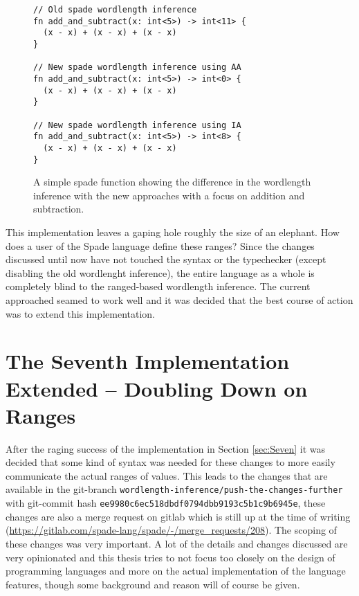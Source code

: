 \begin{figure}
\begin{verbatim}
// Old spade wordlength inference
fn add_and_subtract(x: int<5>) -> int<11> {
  (x - x) + (x - x) + (x - x)
}

// New spade wordlength inference using AA
fn add_and_subtract(x: int<5>) -> int<0> {
  (x - x) + (x - x) + (x - x)
}

// New spade wordlength inference using IA
fn add_and_subtract(x: int<5>) -> int<8> {
  (x - x) + (x - x) + (x - x)
}
\end{verbatim}
  \caption{A simple spade function showing the difference in the wordlength inference with the new approaches with a focus on addition and subtraction.}
  \label{fig:CodeThatWorksNow}
\end{figure}

This implementation leaves a gaping hole roughly the size of an elephant. How does a user of the Spade language define these ranges? Since the changes discussed until now have not touched the syntax or the typechecker (except disabling the old wordlenght inference), the entire language as a whole is completely blind to the ranged-based wordlength inference. The current approached seamed to work well and it was decided that the best course of action was to extend this implementation.

\section{The Seventh Implementation Extended -- Doubling Down on Ranges}
\label{sec:Seven2}
After the raging success of the implementation in Section \ref{sec:Seven} it was decided that some kind of syntax was needed for these changes to more easily communicate the actual ranges of values. This leads to the changes that are available in the git-branch \verb+wordlength-inference/push-the-changes-further+ with git-commit hash \verb+ee9980c6ec518dbdf0794dbb9193c5b1c9b6945e+, these changes are also a merge request on gitlab which is still up at the time of writing (\url{https://gitlab.com/spade-lang/spade/-/merge_requests/208}). The scoping of these changes was very important. A lot of the details and changes discussed are very opinionated and this thesis tries to not focus too closely on the design of programming languages and more on the actual implementation of the language features, though some background and reason will of course be given. 

